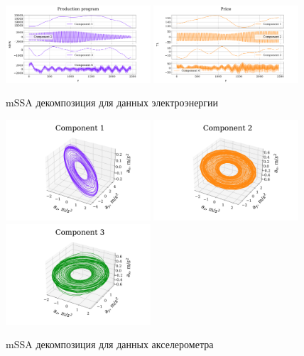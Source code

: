 			\begin{figure}[h]
				\centering
				\includegraphics[width=0.48\textwidth, keepaspectratio]{../experiments/electricity/mssa/figs/decomposition/manual/grouping_1/Production_program.png}
				\includegraphics[width=0.48\textwidth, keepaspectratio]{../experiments/electricity/mssa/figs/decomposition/manual/grouping_1/Price.png}
				\caption{mSSA декомпозиция для данных электроэнергии}\label{fig:electr_decomp_mssa}
			\end{figure}
			
			\begin{figure}[h]
				\centering
				\includegraphics[width=0.48\textwidth, keepaspectratio]{../experiments/motion_1/mssa/figs/decomposition/manual/grouping_2/acceler_1.png}
				\includegraphics[width=0.48\textwidth, keepaspectratio]{../experiments/motion_1/mssa/figs/decomposition/manual/grouping_2/acceler_2.png}
				\includegraphics[width=0.48\textwidth, keepaspectratio]{../experiments/motion_1/mssa/figs/decomposition/manual/grouping_2/acceler_3.png}
				\caption{mSSA декомпозиция для данных акселерометра}\label{fig:accel_decomp_mssa}
			\end{figure}
			
